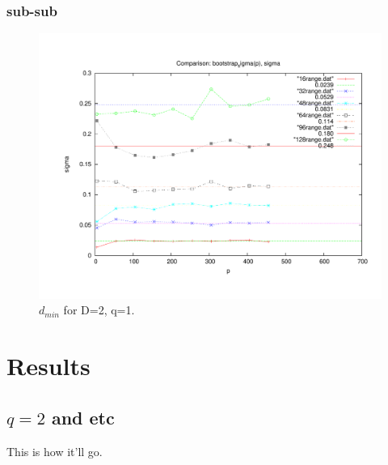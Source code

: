 \documentclass{article}
\begin{document}
\subsubsection{sub-sub}
\label{sec-2.2.1}

\begin{figure}[htp]
\centering
\includegraphics[width=.85\textwidth]{boot}
\caption{$d_{min}$ for D=2, q=1.}\label{fig:1}
\end{figure}
\section{Results}
\label{sec-3}
\subsection{$q=2$ and etc}
\label{sec-3.1}

This is how it'll go.



\end{document}
